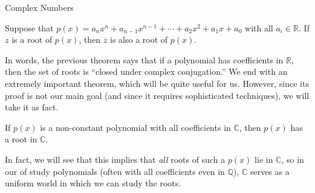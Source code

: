 \begin{section}{Complex Numbers}
\begin{theorem}\label{thm.RootsRealCoeff}
Suppose that $p(x) = a_nx^n + a_{n-1}x^{n-1} +\cdots+a_2x^2+a_1x+a_0$ with all $a_i\in \mathbb{R}$. If $z$ is a root of $p(x)$, then $\overline{z}$ is also a root of $p(x)$.
\end{theorem}

In words, the previous theorem says that if a polynomial has coefficients in $\mathbb{R}$, then the set of roots is ``closed under complex conjugation.'' We end with an extremely important theorem, which will be quite useful for us. However, since its proof is not our main goal (and since it requires sophisticated techniques), we will take it as fact.

\begin{fact}\label{fact.FTA}
If $p(x)$ is a non-constant polynomial with all coefficients in $\mathbb{C}$, then $p(x)$ has a root in $\mathbb{C}$.
\end{fact}

In fact, we will see that this implies that \emph{all} roots of such a $p(x)$ lie in $\mathbb{C}$, so in our of study polynomials (often with all coefficients even in $\mathbb{Q}$), $\mathbb{C}$ serves as a uniform world in which we can study the roots.
\end{section}

